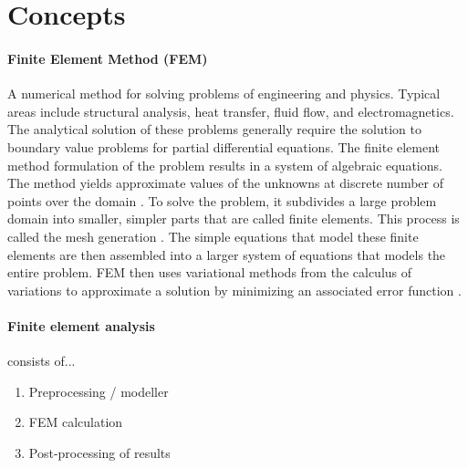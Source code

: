 \section{Concepts}



\paragraph{Finite Element Method (FEM)} A numerical method for solving problems of engineering and physics. Typical areas include structural analysis, heat transfer, fluid flow, and electromagnetics. The analytical solution of these problems generally require the solution to boundary value problems for partial differential equations. The finite element method formulation of the problem results in a system of algebraic equations. The method yields approximate values of the unknowns at discrete number of points over the domain \cite{XXX}. To solve the problem, it subdivides a large problem domain into smaller, simpler parts that are called finite elements. This process is called the mesh generation \cite{XXX}. The simple equations that model these finite elements are then assembled into a larger system of equations that models the entire problem. FEM then uses variational methods from the calculus of variations to approximate a solution by minimizing an associated error function \cite{XXX}.

\paragraph{Finite element analysis} consists of...



\begin{enumerate}
    \item Preprocessing / modeller
    \item FEM calculation
    \item Post-processing of results
\end{enumerate}

